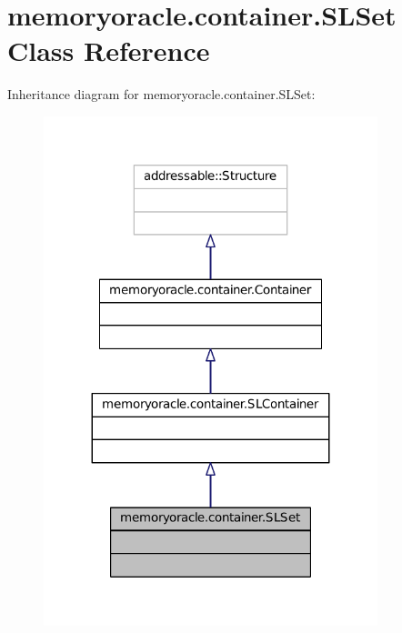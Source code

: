 \hypertarget{classmemoryoracle_1_1container_1_1SLSet}{}\section{memoryoracle.\+container.\+S\+L\+Set Class Reference}
\label{classmemoryoracle_1_1container_1_1SLSet}


Inheritance diagram for memoryoracle.\+container.\+S\+L\+Set\+:\nopagebreak
\begin{figure}[H]
\begin{center}
\leavevmode
\includegraphics[width=275pt]{classmemoryoracle_1_1container_1_1SLSet__inherit__graph}
\end{center}
\end{figure}


